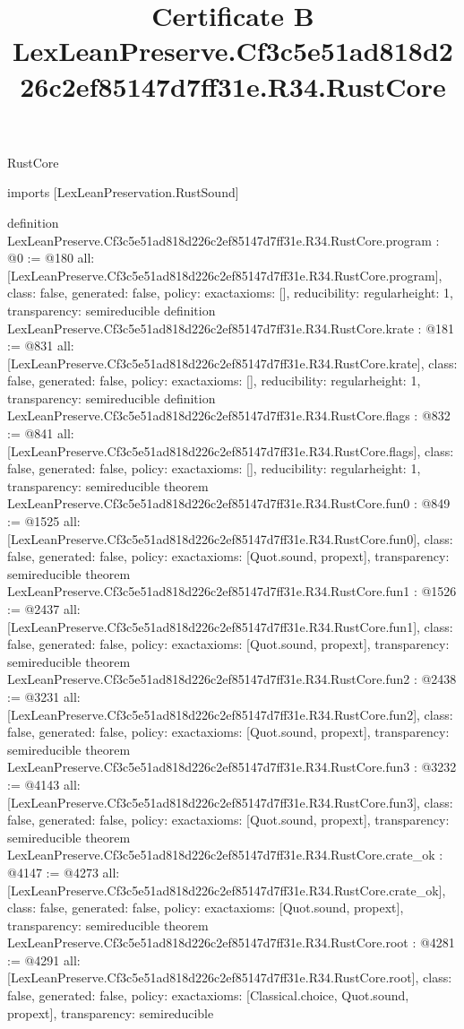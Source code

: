 \begin{lexlean}{RustCore}
\title{Certificate B LexLeanPreserve.Cf3c5e51ad818d226c2ef85147d7ff31e.R34.RustCore}
\begin{coremodule}
imports [LexLeanPreservation.RustSound]

definition LexLeanPreserve.Cf3c5e51ad818d226c2ef85147d7ff31e.R34.RustCore.program : @0 := @180 {
  all: [LexLeanPreserve.Cf3c5e51ad818d226c2ef85147d7ff31e.R34.RustCore.program],
  class: false,
  generated: false,
  policy: exact{axioms: []},
  reducibility: regular{height: 1},
  transparency: semireducible
}
definition LexLeanPreserve.Cf3c5e51ad818d226c2ef85147d7ff31e.R34.RustCore.krate : @181 := @831 {
  all: [LexLeanPreserve.Cf3c5e51ad818d226c2ef85147d7ff31e.R34.RustCore.krate],
  class: false,
  generated: false,
  policy: exact{axioms: []},
  reducibility: regular{height: 1},
  transparency: semireducible
}
definition LexLeanPreserve.Cf3c5e51ad818d226c2ef85147d7ff31e.R34.RustCore.flags : @832 := @841 {
  all: [LexLeanPreserve.Cf3c5e51ad818d226c2ef85147d7ff31e.R34.RustCore.flags],
  class: false,
  generated: false,
  policy: exact{axioms: []},
  reducibility: regular{height: 1},
  transparency: semireducible
}
theorem LexLeanPreserve.Cf3c5e51ad818d226c2ef85147d7ff31e.R34.RustCore.fun0 : @849 := @1525 {
  all: [LexLeanPreserve.Cf3c5e51ad818d226c2ef85147d7ff31e.R34.RustCore.fun0],
  class: false,
  generated: false,
  policy: exact{axioms: [Quot.sound, propext]},
  transparency: semireducible
}
theorem LexLeanPreserve.Cf3c5e51ad818d226c2ef85147d7ff31e.R34.RustCore.fun1 : @1526 := @2437 {
  all: [LexLeanPreserve.Cf3c5e51ad818d226c2ef85147d7ff31e.R34.RustCore.fun1],
  class: false,
  generated: false,
  policy: exact{axioms: [Quot.sound, propext]},
  transparency: semireducible
}
theorem LexLeanPreserve.Cf3c5e51ad818d226c2ef85147d7ff31e.R34.RustCore.fun2 : @2438 := @3231 {
  all: [LexLeanPreserve.Cf3c5e51ad818d226c2ef85147d7ff31e.R34.RustCore.fun2],
  class: false,
  generated: false,
  policy: exact{axioms: [Quot.sound, propext]},
  transparency: semireducible
}
theorem LexLeanPreserve.Cf3c5e51ad818d226c2ef85147d7ff31e.R34.RustCore.fun3 : @3232 := @4143 {
  all: [LexLeanPreserve.Cf3c5e51ad818d226c2ef85147d7ff31e.R34.RustCore.fun3],
  class: false,
  generated: false,
  policy: exact{axioms: [Quot.sound, propext]},
  transparency: semireducible
}
theorem LexLeanPreserve.Cf3c5e51ad818d226c2ef85147d7ff31e.R34.RustCore.crate_ok : @4147 := @4273 {
  all: [LexLeanPreserve.Cf3c5e51ad818d226c2ef85147d7ff31e.R34.RustCore.crate_ok],
  class: false,
  generated: false,
  policy: exact{axioms: [Quot.sound, propext]},
  transparency: semireducible
}
theorem LexLeanPreserve.Cf3c5e51ad818d226c2ef85147d7ff31e.R34.RustCore.root : @4281 := @4291 {
  all: [LexLeanPreserve.Cf3c5e51ad818d226c2ef85147d7ff31e.R34.RustCore.root],
  class: false,
  generated: false,
  policy: exact{axioms: [Classical.choice, Quot.sound, propext]},
  transparency: semireducible
}


\end{coremodule}
\end{lexlean}
